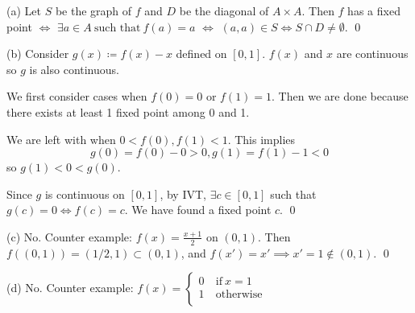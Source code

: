 \documentclass[a4paper, 11pt]{article}
\begin{document}
\begin{solution}
    (a) Let $S$ be the graph of $f$ and $D$ be the diagonal of $A \times A$. Then $f$ has a fixed point $\Leftrightarrow$ $\exists a \in A \:\text{such that}\: f(a) = a$ $\Leftrightarrow$ $(a, a) \in S \Leftrightarrow S \cap D \neq \emptyset$. \qed

    (b) Consider $g(x) \coloneqq f(x) - x$ defined on $[0,1]$. $f(x)$ and $x$ are continuous so $g$ is also continuous.

    We first consider cases when $f(0) = 0$ or $f(1) = 1$. Then we are done because there exists at least 1 fixed point among 0 and 1.

    We are left with when $0 < f(0), f(1) < 1$. This implies \[
    g(0) = f(0) - 0 > 0, g(1) = f(1) - 1 < 0
    \]
    so $g(1) < 0 < g(0)$.

    Since $g$ is continuous on $[0, 1]$, by IVT, $\exists c \in [0,1]$ such that $g(c) = 0 \Leftrightarrow f(c) = c$. We have found a fixed point $c$. \qed

    (c) No. Counter example: $f(x) = \frac{x + 1}{2}$ on $(0, 1)$. Then $f((0, 1)) = (1/2, 1) \subset (0, 1)$, and $f(x') = x' \implies x' = 1 \not \in (0, 1)$. \qed

    (d) No. Counter example: $f(x) = 
    \begin{cases}
        0 & \:\text{if}\: x = 1  \\
        1 & \:\text{otherwise}\: \\
    \end{cases}$
\end{solution}
\end{document}
